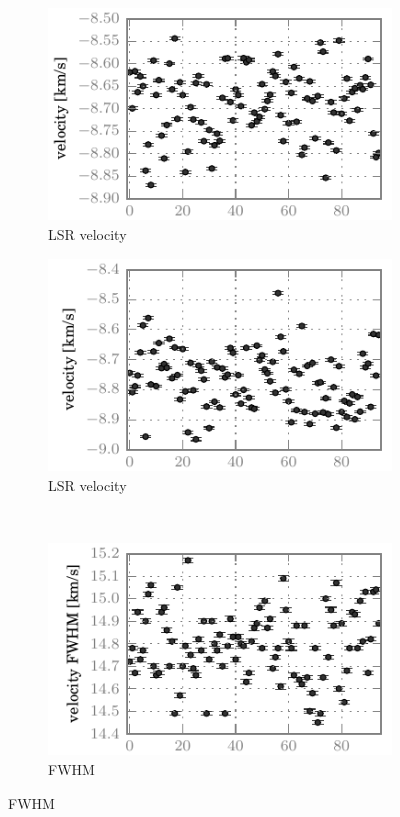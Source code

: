 \begin{figure}[hbtp]
    \centering
    \begin{subfigure}[b]{0.5\textwidth}
        \includegraphics{co87_outf_velo}
        \caption{ LSR velocity}
    \end{subfigure}%
    \begin{subfigure}[b]{0.5\textwidth}
        \includegraphics{co98_outf_velo}
        \caption{ LSR velocity}
    \end{subfigure}%
    \\
    \begin{subfigure}[b]{0.5\textwidth}
        \includegraphics{co87_outf_vfwh}
        \caption{ FWHM}
    \end{subfigure}%

\end{figure}
